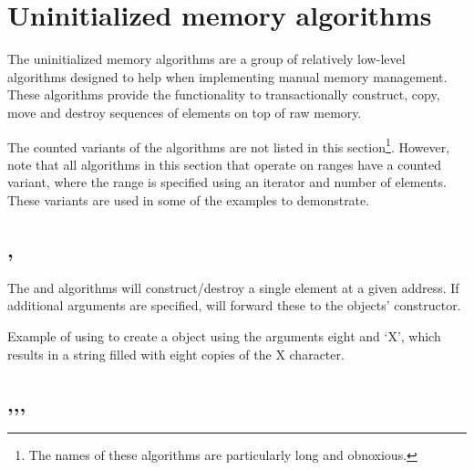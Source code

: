 \section{Uninitialized memory algorithms}

The uninitialized memory algorithms are a group of relatively low-level algorithms designed to help when implementing manual memory management. These algorithms provide the functionality to transactionally construct, copy, move and destroy sequences of elements on top of raw memory.


The counted variants of the algorithms are not listed in this section\footnote{The names of these algorithms are particularly long and obnoxious.}. However, note that all algorithms in this section that operate on ranges have a counted variant, where the range is specified using an iterator and number of elements. These variants are used in some of the examples to demonstrate.

\subsection{\texorpdfstring{, }{\texttt{std::construct\_at}, \texttt{std::destroy\_at}}}

The  and  algorithms will construct/destroy a single element at a given address. If additional arguments are specified,  will forward these to the objects’ constructor.


\begin{box-note}
\footnotesize Example of using  to create a  object using the arguments eight and ‘X’, which results in a string filled with eight copies of the X character.
\tcblower
{}
\end{box-note}

\subsection{\texorpdfstring{,\newline{},\newline{}, \newline{}}{\texttt{std::uninitialized\_default\_construct},\newline\texttt{std::uninitialized_value_construct},\newline\texttt{std::uninitialized_fill}, \newline\texttt{std::destroy}}}


